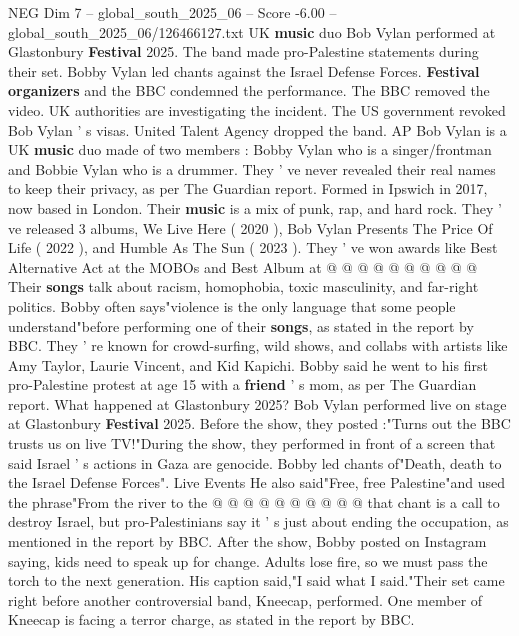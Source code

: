 \begin{textsample}{NEG Dim 7 – global\_south\_2025\_06 – Score -6.00 – global\_south\_2025\_06/126466127.txt}  \label{ex:f7_neg_271}
UK \textbf{music} duo Bob Vylan performed at Glastonbury \textbf{Festival} 2025.
The band made pro-Palestine statements during their set.
Bobby Vylan led chants against the Israel Defense Forces. \textbf{Festival} \textbf{organizers} and the BBC condemned the performance.
The BBC removed the video.
UK authorities are investigating the incident.
The US government revoked Bob Vylan ' s visas.
United Talent Agency dropped the band.
AP Bob Vylan is a UK \textbf{music} duo made of two members : Bobby Vylan who is a singer/frontman and Bobbie Vylan who is a drummer.
They ' ve never revealed their real names to keep their privacy, as per The Guardian report.
Formed in Ipswich in 2017, now based in London.
Their \textbf{music} is a mix of punk, rap, and hard rock.
They ' ve released 3 albums, We Live Here ( 2020 ), Bob Vylan Presents The Price Of Life ( 2022 ), and Humble As The Sun ( 2023 ).
They ' ve won awards like Best Alternative Act at the MOBOs and Best Album at @ @ @ @ @ @ @ @ @ @ Their \textbf{songs} talk about racism, homophobia, toxic masculinity, and far-right politics.
Bobby often says"violence is the only language that some people understand"before performing one of their \textbf{songs}, as stated in the report by BBC.
They ' re known for crowd-surfing, wild shows, and collabs with artists like Amy Taylor, Laurie Vincent, and Kid Kapichi.
Bobby said he went to his first pro-Palestine protest at age 15 with a \textbf{friend} ' s mom, as per The Guardian report.
What happened at Glastonbury 2025?
Bob Vylan performed live on stage at Glastonbury \textbf{Festival} 2025.
Before the show, they posted :"Turns out the BBC trusts us on live TV!"During the show, they performed in front of a screen that said Israel ' s actions in Gaza are genocide.
Bobby led chants of"Death, death to the Israel Defense Forces".
Live Events He also said"Free, free Palestine"and used the phrase"From the river to the @ @ @ @ @ @ @ @ @ @ that chant is a call to destroy Israel, but pro-Palestinians say it ' s just about ending the occupation, as mentioned in the report by BBC.
After the show, Bobby posted on Instagram saying, kids need to speak up for change.
Adults lose fire, so we must pass the torch to the next generation.
His caption said,"I said what I said."Their set came right before another controversial band, Kneecap, performed.
One member of Kneecap is facing a terror charge, as stated in the report by BBC.

\end{textsample}
